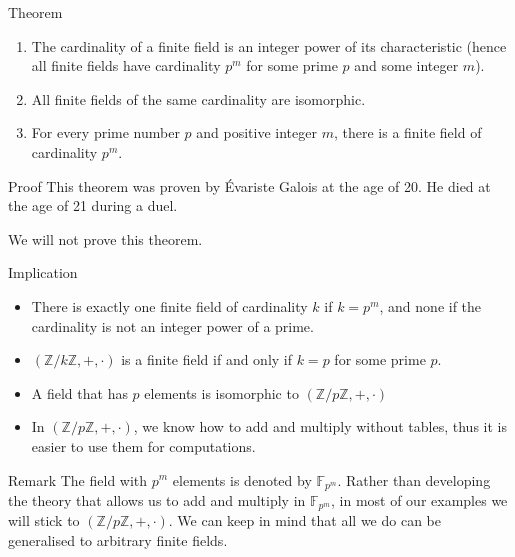 \documentclass[a4paper]{article}
\begin{document}
\begin{parag}{Theorem}
    \begin{enumerate}[left=0pt]
        \item The cardinality of a finite field is an integer power of its characteristic (hence all finite fields have cardinality $p^m$ for some prime $p$ and some integer $m$).
        \item All finite fields of the same cardinality are isomorphic.
        \item For every prime number $p$ and positive integer $m$, there is a finite field of cardinality $p^m$.
    \end{enumerate}
    
    \begin{subparag}{Proof}
        This theorem was proven by Évariste Galois at the age of 20. He died at the age of 21 during a duel.

        We will not prove this theorem.
    \end{subparag}

    \begin{subparag}{Implication}
        \begin{itemize}[left=0pt]
            \item There is exactly one finite field of cardinality $k$ if $k = p^m$, and none if the cardinality is not an integer power of a prime.
            \item $\left(\mathbb{Z} / k\mathbb{Z}, +, \cdot\right)$ is a finite field if and only if $k = p$ for some prime $p$.
            \item A field that has $p$ elements is isomorphic to $\left(\mathbb{Z} / p\mathbb{Z}, +, \cdot\right)$
            \item In $\left(\mathbb{Z} / p\mathbb{Z}, +, \cdot\right)$, we know how to add and multiply without tables, thus it is easier to use them for computations.
        \end{itemize}
    \end{subparag}
    
    \begin{subparag}{Remark}
        The field with $p^m$ elements is denoted by $\mathbb{F}_{p^m}$. Rather than developing the theory that allows us to add and multiply in $\mathbb{F}_{p^m}$, in most of our examples we will stick to $\left(\mathbb{Z}/p\mathbb{Z}, +, \cdot\right)$. We can keep in mind that all we do can be generalised to arbitrary finite fields.
    \end{subparag}
\end{parag}
\end{document}
